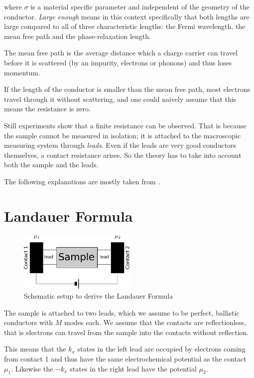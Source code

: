 \documentclass[11pt,twoside]{book}
\begin{document}
where $\sigma$ is a material specific parameter and independent of the
geometry of the conductor. \emph{Large enough} means in this context
specifically that both lengths are large compared to all of three
characteristic lengths: the Fermi wavelength, the mean free path and the
phase-relaxation length.

The mean free path is the average distance which a charge carrier can travel
before it is scattered (by an impurity, electrons or phonons) and thus loses
momentum.

If the length of the conductor is smaller than the mean free path, most
electrons travel through it without scattering, and one could naively assume
that this means the resistance is zero.

Still experiments show that a finite resistance can be observed. That is
because the sample cannot be measured in isolation; it is attached to the
macroscopic measuring system through \emph{leads}. Even if the leads are very
good conductors themselves, a contact resistance arises. So the theory has to
take into account both the sample and the leads.

The following explanations are mostly taken from \cite{datta}.

\section{Landauer Formula}

\begin{figure}
    \begin{center}
        \includegraphics[width=0.5\textwidth]{sample-leads}
    \end{center}
    \caption{Schematic setup to derive the Landauer Formula}
    \label{fig:sample-leads}
\end{figure}

The sample is attached to two leads, which we assume to be perfect, ballistic
conductors with $M$ modes each. We assume that the contacts are
reflectionless, that is electrons can travel from the sample into the contacts
without reflection.

This means that the $k_x$ states in the left lead are occupied by electrons
coming from contact 1 and thus have the same electrochemical potential as
the contact $\mu_1$. Likewise the $-k_x$ states in the right lead have the
potential $\mu_2$.
\end{document}
